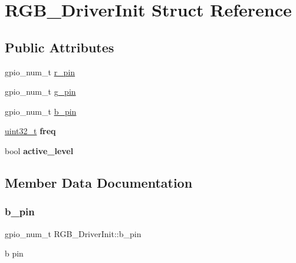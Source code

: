 \hypertarget{structRGB__DriverInit}{}\section{R\+G\+B\+\_\+\+Driver\+Init Struct Reference}
\label{structRGB__DriverInit}
\subsection*{Public Attributes}
\begin{DoxyCompactItemize}
\item 
gpio\+\_\+num\+\_\+t \hyperlink{structRGB__DriverInit_aa526026fc4e1d13ac66e4a013b117d98}{r\+\_\+pin}
\item 
gpio\+\_\+num\+\_\+t \hyperlink{structRGB__DriverInit_a7a39fdff170dde0f5419ae37b5165f57}{g\+\_\+pin}
\item 
gpio\+\_\+num\+\_\+t \hyperlink{structRGB__DriverInit_ac543562dcdccdf37a02426f180f0584b}{b\+\_\+pin}
\item 
\mbox{\label{structRGB__DriverInit_a7966199eee2401633a0070039f13e1ad}} 
\hyperlink{vl53l0x__types_8h_a435d1572bf3f880d55459d9805097f62}{uint32\+\_\+t} {\bfseries freq}
\item 
\mbox{\label{structRGB__DriverInit_a016dbcefff928b50269ebec77f932d0a}} 
bool {\bfseries active\+\_\+level}
\end{DoxyCompactItemize}


\subsection{Member Data Documentation}
\mbox{\label{structRGB__DriverInit_ac543562dcdccdf37a02426f180f0584b}} 
\subsubsection{\texorpdfstring{b\+\_\+pin}{b\_pin}}
{\footnotesize\ttfamily gpio\+\_\+num\+\_\+t R\+G\+B\+\_\+\+Driver\+Init\+::b\+\_\+pin}

b pin \mbox{\label{structRGB__DriverInit_a7a39fdff170dde0f5419ae37b5165f57}} 
